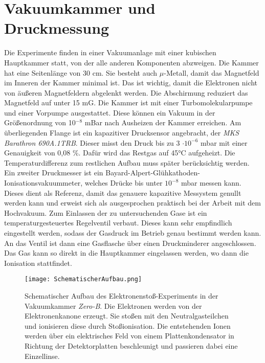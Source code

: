 \section{Vakuumkammer und Druckmessung}
Die Experimente finden in einer Vakuumanlage mit einer kubischen Hauptkammer statt, von der alle anderen Komponenten abzweigen. Die Kammer hat eine Seitenlänge von 30 cm. Sie besteht auch $\mu$-Metall, damit das Magnetfeld im Inneren der Kammer minimal ist. Das ist wichtig, damit die Elektronen nicht von äußeren Magnetfeldern abgelenkt werden. Die Abschirmung reduziert das Magnetfeld auf unter 15 mG. Die Kammer ist mit einer Turbomolekularpumpe und einer Vorpumpe ausgestattet. Diese können ein Vakuum in der Größenordnung von 10$^{-8}$ mBar nach Ausheizen der Kammer erreichen. Am überliegenden Flange ist ein kapazitiver Drucksensor angebracht, der \textit{MKS Barathron 690A.1TRB}. Dieser misst den Druck bis zu 3 $\cdot 10^{-6}$ mbar mit einer Genauigkeit von 0,08 \%. Dafür wird das Restgas auf \ang{45}C aufgeheizt. Die Temperaturdifferenz zum restlichen Aufbau muss später berücksichtig werden. Ein zweiter Druckmesser ist ein Bayard-Alpert-Glühkathoden-Ionisationsvakuummeter, welches Drücke bis unter $10^{-8}$ mbar messen kann. Dieses dient als Referenz, damit das genauere kapazitive Messystem genullt werden kann und erweist sich als ausgesprochen praktisch bei der Arbeit mit dem Hochvakuum.
Zum Einlassen der zu untersuchenden Gase ist ein temperaturgesteuertes Regelventil verbaut. Dieses kann sehr empfindlich eingestellt werden, sodass der Gasdruck im Betrieb genau bestimmt werden kann. An das Ventil ist dann eine Gasflasche über einen Druckminderer angeschlossen. Das Gas kann so direkt in die Hauptkammer eingelassen werden, wo dann die Ionisation stattfindet.

\begin{figure}
    \centering
    \texttt{[image: SchematischerAufbau.png]}
    \caption[Schematischer Aufbau des Experiments]{Schematischer Aufbau des Elektronenstoß-Experiments in der Vakuumkammer \textit{Zero-B}. Die Elektronen werden von der Elektronenkanone erzeugt. Sie stoßen mit den Neutralgasteilchen und ionisieren diese durch Stoßionisation. Die entstehenden Ionen werden über ein elektrisches Feld von einem Plattenkondensator in Richtung der Detektorplatten beschleunigt und passieren dabei eine Einzellinse.}
    \label{fig:Aufbau}
\end{figure}

